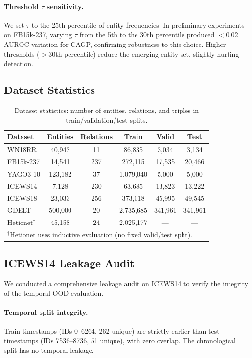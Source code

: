\documentclass{article}
\begin{document}
\paragraph{Threshold $\tau$ sensitivity.}
We set $\tau$ to the 25th percentile of entity frequencies. In preliminary experiments on FB15k-237, varying $\tau$ from the 5th to the 30th percentile produced $<$0.02 AUROC variation for CAGP, confirming robustness to this choice. Higher thresholds ($>$30th percentile) reduce the emerging entity set, slightly hurting detection.

\subsection{Dataset Statistics}
\label{app:datasets}

\begin{table}[ht]
\centering
\caption{Dataset statistics: number of entities, relations, and triples in train/validation/test splits.}
\begin{tabular}{lccccc}
\toprule
Dataset & Entities & Relations & Train & Valid & Test \\
\midrule
WN18RR & 40,943 & 11 & 86,835 & 3,034 & 3,134 \\
FB15k-237 & 14,541 & 237 & 272,115 & 17,535 & 20,466 \\
YAGO3-10 & 123,182 & 37 & 1,079,040 & 5,000 & 5,000 \\
ICEWS14 & 7,128 & 230 & 63,685 & 13,823 & 13,222 \\
ICEWS18 & 23,033 & 256 & 373,018 & 45,995 & 49,545 \\
GDELT & 500,000 & 20 & 2,735,685 & 341,961 & 341,961 \\
Hetionet$^\dagger$ & 45,158 & 24 & 2,025,177 & --- & --- \\
\bottomrule
\multicolumn{6}{l}{\scriptsize $^\dagger$Hetionet uses inductive evaluation (no fixed valid/test split).}
\end{tabular}
\end{table}

\subsection{ICEWS14 Leakage Audit}
\label{app:leakage}

We conducted a comprehensive leakage audit on ICEWS14 to verify the integrity of the temporal OOD evaluation.

\paragraph{Temporal split integrity.}
Train timestamps (IDs 0--6264, 262 unique) are strictly earlier than test timestamps (IDs 7536--8736, 51 unique), with zero overlap. The chronological split has no temporal leakage.
\end{document}
